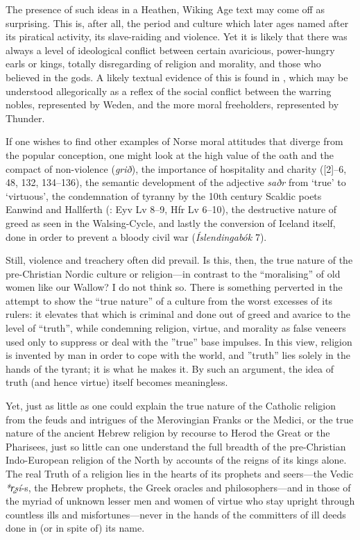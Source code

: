 The presence of such ideas in a Heathen, Wiking Age text may come off as surprising.  This is, after all, the period and culture which later ages named after its piratical activity, its slave-raiding and violence.  Yet it is likely that there was always a level of ideological conflict between certain avaricious, power-hungry earls or kings, totally disregarding of religion and morality, and those who believed in the gods.  A likely textual evidence of this is found in , which may be understood allegorically as a reflex of the social conflict between the warring nobles, represented by Weden, and the more moral freeholders, represented by Thunder.

If one wishes to find other examples of Norse moral attitudes that diverge from the popular conception, one might look at the high value of the oath and the compact of non-violence (\emph{grið}), the importance of hospitality and charity ([2]--6, 48, 132, 134--136), the semantic development of the adjective \emph{saðr} from ‘true’ to ‘virtuous’, the condemnation of tyranny by the 10th century Scaldic poets Eanwind and Hallferth (\Skp: Eyv Lv 8--9, Hfr Lv 6--10), the destructive nature of greed as seen in the Walsing-Cycle, and lastly the conversion of Iceland itself, done in order to prevent a bloody civil war (\emph{Íslendingabók} 7).

Still, violence and treachery often did prevail.  Is this, then, the true nature of the pre-Christian Nordic culture or religion---in contrast to the “moralising” of old women like our Wallow?  I do not think so.  There is something perverted in the attempt to show the “true nature” of a culture from the worst excesses of its rulers: it elevates that which is criminal and done out of greed and avarice to the level of “truth”, while condemning religion, virtue, and morality as false veneers used only to suppress or deal with the ”true” base impulses.  In this view, religion is invented by man in order to cope with the world, and ”truth” lies solely in the hands of the tyrant; it is what he makes it.  By such an argument, the idea of truth (and hence virtue) itself becomes meaningless.

Yet, just as little as one could explain the true nature of the Catholic religion from the feuds and intrigues of the Merovingian Franks or the Medici, or the true nature of the ancient Hebrew religion by recourse to Herod the Great or the Pharisees, just so little can one understand the full breadth of the pre-Christian Indo-European religion of the North by accounts of the reigns of its kings alone.
The real Truth of a religion lies in the hearts of its prophets and seers---the Vedic \emph{*r̥ṣí}-s, the Hebrew prophets, the Greek oracles and philosophers---and in those of the myriad of unknown lesser men and women of virtue who stay upright through countless ills and misfortunes---never in the hands of the committers of ill deeds done in (or in spite of) its name.

